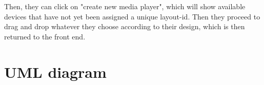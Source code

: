 \documentclass{exam}
\begin{document}
Then, they can click on "create new media player", which will show available devices that have not yet been assigned a unique layout-id. Then they proceed to drag and drop whatever they choose according to their design, which is then returned to the front end.

\bigskip

\section{UML diagram}
\bigskip
\end{document}
